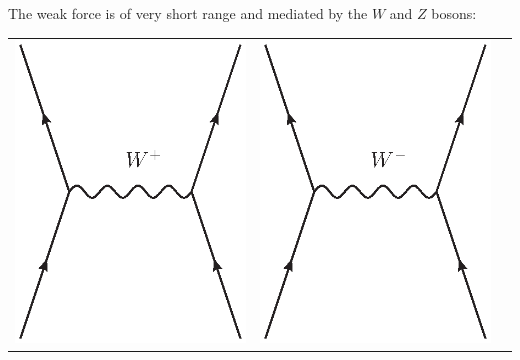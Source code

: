 \documentclass{article}
\begin{document}
The weak force is of very short range and mediated by the $W$ and $Z$ bosons:
\begin{center}
	\begin{tabular}{ccc}
		\includegraphics[scale=0.6]{W+_exchange} &
                \includegraphics[scale=0.6]{W-_exchange} & 

\end{tabular}
\end{center}
\end{document}
